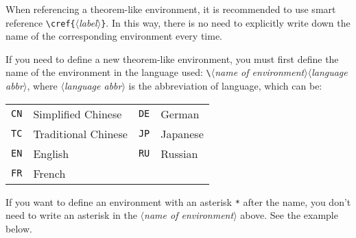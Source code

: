 \documentclass[allowbf]{lebhart}
\providecommand{\meta}[1]{$\langle${\normalfont\itshape#1}$\rangle$}
\newenvironment{remind}[1][Remind]{%
    \begin{tcolorbox}[breakable,
        enhanced,
        width = \textwidth,
        colback = white, colbacktitle = paper,
        colframe = gray!50, boxrule=0.2mm,
        coltitle = black,
        fonttitle = \sffamily,
        attach boxed title to top left = {yshift=-\tcboxedtitleheight/2,  xshift=\tcboxedtitlewidth/4},
        boxed title style = {boxrule=0pt, colframe=paper},
        before skip = 0.3cm,
        after skip = 0.3cm,
        top = 3mm,
        bottom = 3mm,
        title={\scshape\sffamily #1}]%
}{\end{tcolorbox}}
\begin{document}
When referencing a theorem-like environment, it is recommended to use smart reference \lstinline|\cref{|\meta{label}\texttt{\}}. In this way, there is no need to explicitly write down the name of the corresponding environment every time.

\medskip
If you need to define a new theorem-like environment, you must first define the name of the environment in the language used: \lstinline|\|\meta{name of environment}\meta{language abbr}, where \meta{language abbr} is the abbreviation of language, which can be:
\begin{longtable}{ll|ll}
    \texttt{CN} & Simplified Chinese & \texttt{DE} & German\\
    \texttt{TC} & Traditional Chinese & \texttt{JP} & Japanese\\
    \texttt{EN} & English & \texttt{RU} & Russian\\
    \texttt{FR} & French & &\\
\end{longtable}

\begin{remind}
    If you want to define an environment with an asterisk \lstinline|*| after the name, you don't need to write an asterisk in the \meta{name of environment} above. See the example below.
\end{remind}
\end{document}
